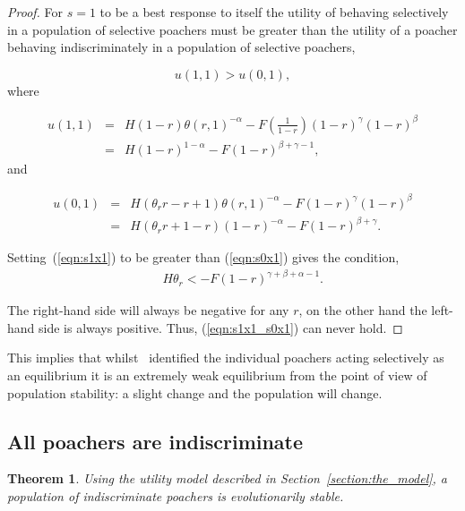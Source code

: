\documentclass[10pt]{article}
\newtheorem{theorem}{Theorem}
\begin{document}
\begin{proof}
    For \(s=1\) to be a best response to itself the utility of behaving
    selectively in a population of selective poachers must be greater than the utility
    of a poacher behaving indiscriminately in a population of selective poachers,

    \begin{equation}
    u(1,1) > u(0,1),
    \end{equation}
    where

    \begin{eqnarray}
    \label{eqn:s1x1}
    u(1, 1) & = & H(1 -r)\theta(r, 1) ^ {- \alpha} - F (\frac{1}{1 - r})(1 - r)^{\gamma}(1 - r)^{\beta} \\
    & = & H(1 - r)^{1 - \alpha} - F(1 - r)^{\beta + \gamma - 1},
    \end{eqnarray}
    and

    \begin{eqnarray}
    \label{eqn:s0x1}
    u(0,1) & = & H(\theta_r r - r + 1)\theta(r, 1) ^ {- \alpha} - F (1 - r)^{\gamma}(1 - r)^{\beta} \\
           & = & H(\theta_r r +1 - r)(1 - r)^{-\alpha} - F(1 - r)^{\beta + \gamma}.
    \end{eqnarray}

    \noindent Setting~(\ref{eqn:s1x1}) to be greater than (\ref{eqn:s0x1}) gives the
    condition,
    \begin{eqnarray}
    \label{eqn:s1x1_s0x1}
    &&H \theta_r< -F(1 - r)^{\gamma + \beta + \alpha - 1}.
    \end{eqnarray}

    The right-hand side  will always be negative
    for any \(r\), on the other hand the left-hand side is always positive.
    Thus, (\ref{eqn:s1x1_s0x1}) can never hold.
\end{proof}

This implies that whilst~\cite{Lee} identified the individual poachers
acting selectively as an equilibrium it is an extremely weak equilibrium from
the point of view of population stability: a slight change and the population
will change.

\subsection{All poachers are indiscriminate}

\begin{theorem}\label{theorem:indiscriminate}
Using the utility model described in Section~\ref{section:the_model}, a population
of indiscriminate poachers is evolutionarily stable.
\end{theorem}
\end{document}
